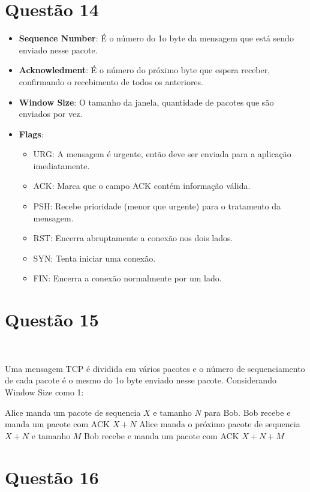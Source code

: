 \documentclass{article}
\begin{document}
\newpage
\section*{Questão 14}

\begin{itemize}
    \item \textbf{Sequence Number}:
        É o número do 1o byte da mensagem
        que está sendo enviado nesse pacote.
    \item \textbf{Acknowledment}:
        É o número do próximo byte que espera receber,
        confirmando o recebimento de todos os anteriores.
    \item \textbf{Window Size}:
        O tamanho da janela,
        quantidade de pacotes que são enviados por vez.
    \item \textbf{Flags}:
        \begin{itemize}
            \item URG:
                A mensagem é urgente,
                então deve ser enviada para a aplicação imediatamente.
            \item ACK:
                Marca que o campo ACK contém informação válida.
            \item PSH:
                Recebe prioridade (menor que urgente)
                para o tratamento da mensagem.
            \item RST:
                Encerra abruptamente a conexão nos dois lados.
            \item SYN:
                Tenta iniciar uma conexão.
            \item FIN:
                Encerra a conexão normalmente por um lado.
    \end{itemize}
\end{itemize}

\section*{Questão 15}\

Uma mensagem TCP é dividida em vários pacotes e
o número de sequenciamento de cada pacote é
o mesmo do 1o byte enviado nesse pacote.
Considerando Window Size como 1:

Alice manda um pacote de sequencia $X$ e tamanho $N$ para Bob.
Bob recebe e manda um pacote com ACK $X+N$
Alice manda o próximo pacote de sequencia $X+N$ e tamanho $M$
Bob recebe e manda um pacote com ACK $X+N+M$

\section*{Questão 16}\
\end{document}
